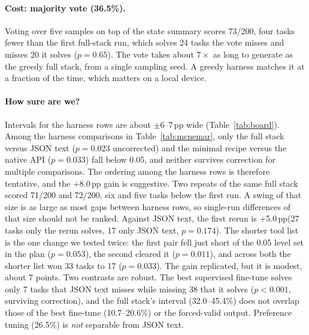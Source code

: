 \documentclass[11pt]{article}
\newcommand{\pp}{\,pp\xspace}
\begin{document}
\paragraph{Cost: majority vote (36.5\%).} Voting over five samples on top of the state summary scores 73/200, four tasks fewer than the first full-stack run, which solves 24 tasks the vote misses and misses 20 it solves ($p=0.65$). The vote takes about $7\times$ as long to generate as the greedy full stack, from a single sampling seed. A greedy harness matches it at a fraction of the time, which matters on a local device.

\paragraph{How sure are we?} Intervals for the harness rows are about $\pm6$--7\pp wide (Table~\ref{tab:board}). Among the harness comparisons in Table~\ref{tab:mcnemar}, only the full stack versus JSON text ($p=0.023$ uncorrected) and the minimal recipe versus the native API ($p=0.033$) fall below 0.05, and neither survives correction for multiple comparisons. The ordering among the harness rows is therefore tentative, and the +8.0\pp gain is suggestive. Two repeats of the same full stack scored 71/200 and 72/200, six and five tasks below the first run. A swing of that size is as large as most gaps between harness rows, so single-run differences of that size should not be ranked. Against JSON text, the first rerun is +5.0\pp (27 tasks only the rerun solves, 17 only JSON text, $p=0.174$). The shorter tool list is the one change we tested twice: the first pair fell just short of the 0.05 level set in the plan ($p=0.053$), the second cleared it ($p=0.011$), and across both the shorter list won 33 tasks to 17 ($p=0.033$). The gain replicated, but it is modest, about 7 points. Two contrasts are robust. The best supervised fine-tune solves only 7 tasks that JSON text misses while missing 38 that it solves ($p<0.001$, surviving correction), and the full stack's interval (32.0--45.4\%) does not overlap those of the best fine-tune (10.7--20.6\%) or the forced-valid output. Preference tuning (26.5\%) is \emph{not} separable from JSON text.
\end{document}
